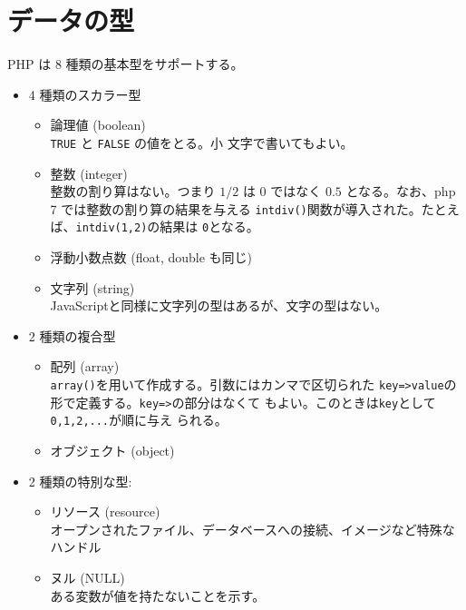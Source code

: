 \section{データの型}
PHP は 8 種類の基本型をサポートする。
\begin{itemize}
 \item 4 種類のスカラー型
 \begin{itemize}
  \item 論理値 (boolean)\\\texttt{TRUE} と \texttt{FALSE} の値をとる。小
	文字で書いてもよい。
  \item 整数 (integer)\\整数の割り算はない。つまり $1/2$ は $0$ ではなく
	$0.5$ となる。{なお、php 7 では整数の割り算の結果を与える
        \Verb+intdiv()+関数が導入された。たとえば、\Verb+intdiv(1,2)+の結果は
        \Verb+0+となる。}
  \item 浮動小数点数 (float, double も同じ)
  \item 文字列 (string)\\
JavaScriptと同様に文字列の型はあるが、文字の型はない。
 \end{itemize}
 \item 2 種類の複合型
 \begin{itemize}
  \item 配列 (array)\\
\texttt{array()}を用いて作成する。引数にはカンマで区切られた
	\texttt{key=>value}の形で定義する。\texttt{key=>}の部分はなくて
	もよい。このときは\texttt{key}として\texttt{0,1,2,...}が順に与え
	られる。
  \item オブジェクト (object)
 \end{itemize}
 \item 2 種類の特別な型:
\begin{itemize}
 \item リソース (resource)\\
オープンされたファイル、データベースへの接続、イメージなど特殊なハンドル
       
 \item ヌル (NULL)\\
ある変数が値を持たないことを示す。
\end{itemize}
\end{itemize}
